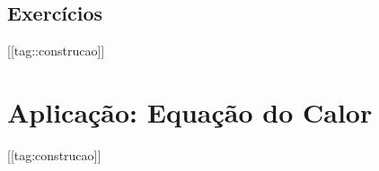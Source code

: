 





    


        


\subsection{Exercícios}
[[tag::construcao]]

\section{Aplicação: Equação do Calor}\label{cap_mlp_sec_calor}
[[tag:construcao]]

